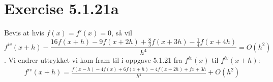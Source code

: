 

\section*{Exercise 5.1.21a}
\label{sec:oppgave21a}

Bevis at hvis $f(x) = f'(x) = 0$, så vil 
\[{f^{iv}}(x + h) - \frac{{16f(x + h) - 9f(x + 2h) + \frac{8}{3}f(x + 3h) - \frac{1}{4}f(x + 4h)}}{{{h^4}}} = O({h^2})\].
Vi endrer uttrykket vi kom fram til i oppgave 5.1.21 fra ${f^{iv}}(x)$ til ${f^{iv}}(x + h)$: 
\begin{align}
{f^{iv}}(x + h) = \frac{{f(x - h) - 4f(x) + 6f(x + h) - 4f(x + 2h) + fx + 3h}}{{{h^4}}} + O({h^2}) \nonumber \\
 \nonumber \\ \nonumber
\end{align}